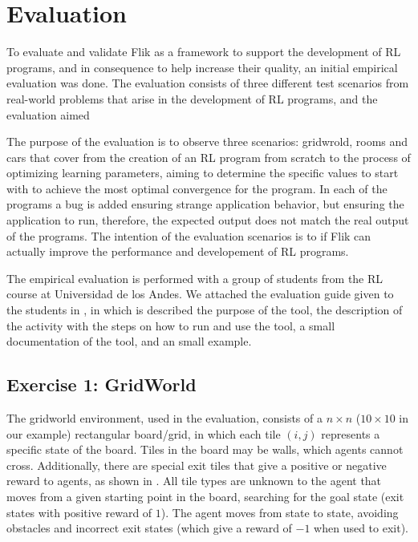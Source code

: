 
\chapter{Evaluation}
\label{cha:evaluation}

To evaluate and validate \ac{Flik} as a framework to support the development 
of \ac{RL} programs, and in consequence to help increase their quality, 
an initial empirical evaluation was done. The evaluation consists of three different test scenarios 
from real-world problems that arise in the development of \ac{RL} programs, and the evaluation aimed

The purpose of the evaluation is to observe three scenarios: gridwrold, rooms and cars that cover from 
the creation of an \ac{RL} program from scratch to the process of optimizing 
learning parameters, aiming to determine the specific values to start with 
to achieve the most optimal convergence for the program. In each of the programs a bug 
is added ensuring strange application behavior, but ensuring the application to run, 
therefore, the expected output does not match the real output of the programs. The intention of 
the evaluation scenarios is to if \ac{Flik} can actually improve the performance and developement of \ac{RL}
programs.

The empirical evaluation is performed with a group of students from the \ac{RL} course at Universidad de 
los Andes. We attached the evaluation guide given to the students in , in which 
is described the purpose of the tool, the description of the activity with the steps on how to run and 
use the tool, a small documentation of the tool, and an small example.

\section{Exercise 1: GridWorld}
\label{sec:grid-eval}

The gridworld environment, used in the evaluation, consists of a $n\times n$ ($10\times 10$ in our example) rectangular 
board/grid, in which each tile $(i,j)$ represents a specific state of the board. Tiles in the board may be 
walls, which agents cannot cross. Additionally, there are special exit 
tiles that give a positive or negative reward to agents, as shown in . All tile types 
are unknown to the agent that moves from a given starting point in the board, searching for the goal 
state (\ie exit states with positive reward of $1$). The agent moves from state to state, avoiding 
obstacles and incorrect exit states (which give a reward of $-1$ when used to exit). 

